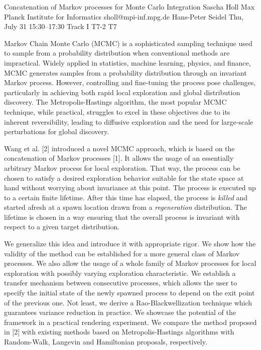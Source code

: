 \begin{talk}
  {Concatenation of Markov processes for Monte Carlo Integration}%
  {Sascha Holl}%
  {Max Planck Institute for Informatics}%
  {sholl@mpi-inf.mpg.de}%
  {Hans-Peter Seidel}%
  {}%
  {Thu, July 31 15:30–17:30 Track I}%
  {T7-2}%
  {T7}%

Markov Chain Monte Carlo (MCMC) is a sophisticated sampling technique used to sample from a probability distribution when conventional methods are impractical. Widely applied in statistics, machine learning, physics, and finance, MCMC generates samples from a probability distribution through an invariant Markov process. However, controlling and fine-tuning the process pose challenges, particularly in achieving both rapid local exploration and global distribution discovery. The Metropolis-Hastings algorithm, the most popular MCMC technique, while practical, struggles to excel in these objectives due to its inherent reversibility, leading to diffusive exploration and the need for large-scale perturbations for global discovery.

Wang et al. [2] introduced a novel MCMC approach, which is based on the concatenation of Markov processes [1]. It allows the usage of an essentially arbitrary Markov process for local exploration. That way, the process can be chosen to satisfy a desired exploration behavior suitable for the state space at hand without worrying about invariance at this point. The process is executed up to a certain finite lifetime. After this time has elapsed, the process is \textit{killed} and started afresh at a spawn location drawn from a \textit{regeneration} distribution. The lifetime is chosen in a way ensuring that the overall process is invariant with respect to a given target distribution.

We generalize this idea and introduce it with appropriate rigor. We show how the validity of the method can be established for a more general class of Markov processes. We also allow the usage of a whole family of Markov processes for local exploration with possibly varying exploration characteristic. We establish a transfer mechanism between consecutive processes, which allows the user to specify the initial state of the newly spawned process to depend on the exit point of the previous one. Not least, we derive a Rao-Blackwellization technique which guarantees variance reduction in practice.
We showcase the potential of the framework in a practical rendering experiment. We compare the method proposed in [2] with existing methods based on Metropolis-Hastings algorithms with Random-Walk, Langevin and Hamiltonian proposals, respectively.


\end{talk}
